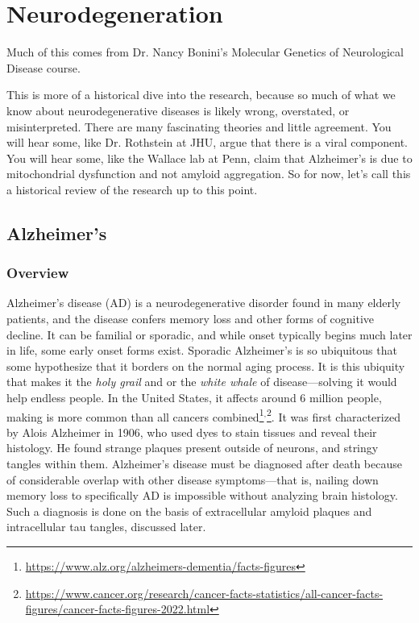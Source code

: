 \chapter{Neurodegeneration}

Much of this comes from Dr. Nancy Bonini's Molecular Genetics of Neurological Disease course.\newline

This is more of a historical dive into the research, because so much of what we know about neurodegenerative diseases is likely wrong, overstated, or misinterpreted. There are many fascinating theories and little agreement. You will hear some, like Dr. Rothstein at JHU, argue that there is a viral component. You will hear some, like the Wallace lab at Penn, claim that Alzheimer's is due to mitochondrial dysfunction and not amyloid aggregation. So for now, let's call this a historical review of the research up to this point.\newline

\section{Alzheimer's}

\subsection*{Overview}

Alzheimer's disease (AD) is a neurodegenerative disorder found in many elderly patients, and the disease confers memory loss and other forms of cognitive decline. It can be familial or sporadic, and while onset typically begins much later in life, some early onset forms exist. Sporadic Alzheimer's is so ubiquitous that some hypothesize that it borders on the normal aging process. It is this ubiquity that makes it the \textit{holy grail} and or the \textit{white whale} of disease---solving it would help endless people. In the United States, it affects around 6 million people, making is more common than all cancers combined\footnote{\url{https://www.alz.org/alzheimers-dementia/facts-figures}}$^,$\footnote{\url{https://www.cancer.org/research/cancer-facts-statistics/all-cancer-facts-figures/cancer-facts-figures-2022.html}}. It was first characterized by Alois Alzheimer in 1906, who used dyes to stain tissues and reveal their histology. He found strange plaques present outside of neurons, and stringy tangles within them. Alzheimer's disease must be diagnosed after death because of considerable overlap with other disease symptoms---that is, nailing down memory loss to specifically AD is impossible without analyzing brain histology. Such a diagnosis is done on the basis of extracellular amyloid plaques and intracellular tau tangles, discussed later.\newline

